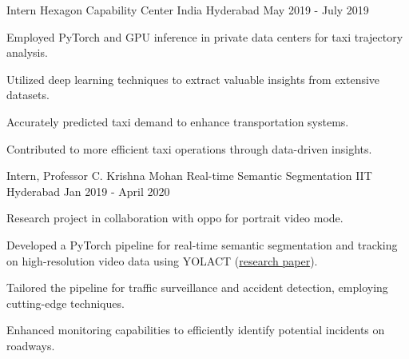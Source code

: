 \begin{cventries}
\cventry
    {Intern} %
    {Hexagon Capability Center India} %
    {Hyderabad} %
    {May 2019 - July 2019} %
    {
    \begin{cvitems}
        \item Employed PyTorch and GPU inference in private data centers for taxi trajectory analysis.
        \item Utilized deep learning techniques to extract valuable insights from extensive datasets.
        \item Accurately predicted taxi demand to enhance transportation systems.
        \item Contributed to more efficient taxi operations through data-driven insights.
    \end{cvitems}
    }

\cventry
    {Intern, Professor C. Krishna Mohan} %
    {Real-time Semantic Segmentation} %
    {IIT Hyderabad} %
    {Jan 2019 - April 2020} %
    {
    \begin{cvitems}
        \item Research project in collaboration with oppo for portrait video mode.
        \item Developed a PyTorch pipeline for real-time semantic segmentation and tracking on high-resolution video data using YOLACT (\textcolor{linkBlue}{\href{https://arxiv.org/abs/1904.02689}{research paper}}).
        \item Tailored the pipeline for traffic surveillance and accident detection, employing cutting-edge techniques.
        \item Enhanced monitoring capabilities to efficiently identify potential incidents on roadways.
    \end{cvitems}
    }

\end{cventries}
